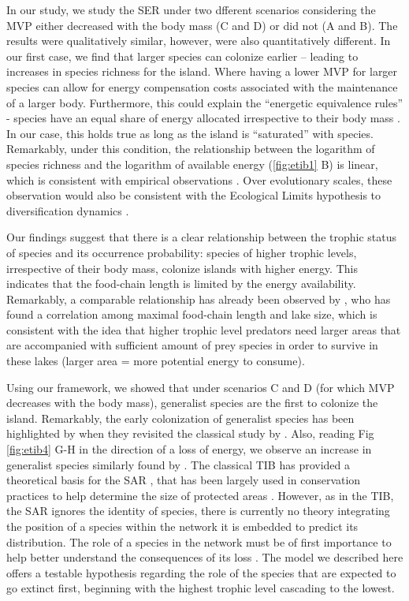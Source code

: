 In our study, we study the SER under two dfferent scenarios considering
the MVP either decreased with the body mass (C and D) or did not (A and
B). The results were qualitatively similar, however, were also
quantitatively different. In our first case, we find that larger species
can colonize earlier -- leading to increases in species richness for the
island. Where having a lower MVP for larger species can allow for energy
compensation costs associated with the maintenance of a larger body.
Furthermore, this could explain the ``energetic equivalence rules''
\citep{Nee1991} - species have an equal share of energy allocated
irrespective to their body mass \citep{Brown2003, Damuth2007}. In our
case, this holds true as long as the island is ``saturated'' with
species. Remarkably, under this condition, the relationship between the
logarithm of species richness and the logarithm of available energy
(\ref{fig:etib1} B) is linear, which is consistent with empirical
observations \citep[see Fig 3. and Fig 4. in][]{Wright1983}. Over
evolutionary scales, these observation would also be consistent with the
Ecological Limits hypothesis to diversification dynamics \citep{Rabosky2015}.

Our findings suggest that there is a clear relationship between the
trophic status of species and its occurrence probability: species of
higher trophic levels, irrespective of their body mass, colonize islands
with higher energy. This indicates that the food-chain length is limited
by the energy availability. Remarkably, a comparable relationship has
already been observed by \citet{Post2000}, who has found a correlation
among maximal food-chain length and lake size, which is consistent with
the idea that higher trophic level predators need larger areas that are
accompanied with sufficient amount of prey species in order to survive
in these lakes (larger area = more potential energy to consume).

Using our framework, we showed that under scenarios C and D (for which
MVP decreases with the body mass), generalist species are the first to
colonize the island. Remarkably, the early colonization of generalist
species has been highlighted by \citet{Piechnik2008} when they revisited
the classical study by \citet{Simberloff1969}. Also, reading Fig
\ref{fig:etib4} G-H in the direction of a loss of energy, we observe an
increase in generalist species similarly found by \citet{Clavel2011}.
The classical TIB has provided a theoretical basis for the SAR
\citep{MacArthur1967}, that has been largely used in conservation
practices to help determine the size of protected areas
\citep{Neigel2003}. However, as in the TIB, the SAR ignores the identity
of species, there is currently no theory integrating the position of a
species within the network it is embedded to predict its distribution.
The role of a species in the network must be of first importance to help
better understand the consequences of its loss \citep{Saterberg2013}.
The model we described here offers a testable hypothesis regarding the
role of the species that are expected to go extinct first, beginning
with the highest trophic level cascading to the lowest.

